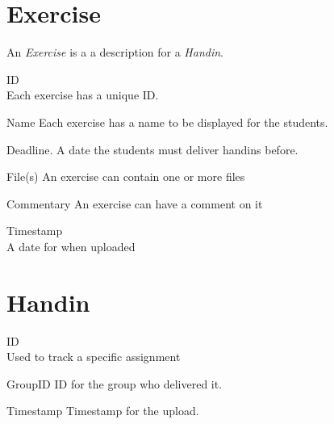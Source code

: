 \documentclass[Main]{subfiles}
\begin{document}
\newpage

\section{Exercise}
An \textit{Exercise} is a a description for a \textit{Handin}.
\begin{DataIntro}
\rExample{}
\end{DataIntro}

\begin{DataTable}

\Record
{ID\\
Each exercise has a unique ID.}
{}
{}

\Record
{Name}
{Each exercise has a name to be displayed for the students.}
{}

\Record
{Deadline.}
{A date the students must deliver handins before.}
{}


\Record
{File(s)}
{An exercise can contain one or more files}
{}


\Record
{Commentary}
{An exercise can have a comment on it}
{}


\Record
{Timestamp\\}
{A date for when uploaded}
{}
\end{DataTable}






\newpage

\section{Handin}

	
\begin{DataIntro}
\rExample{}
\end{DataIntro}

\begin{DataTable}

\Record
{ID\\
Used to track a specific assignment}
{}
{}

\Record
{GroupID}
{ID for the group who delivered it.}
{}


\Record
{Timestamp}
{Timestamp for the upload.}
{}
\end{DataTable}
\end{document}
